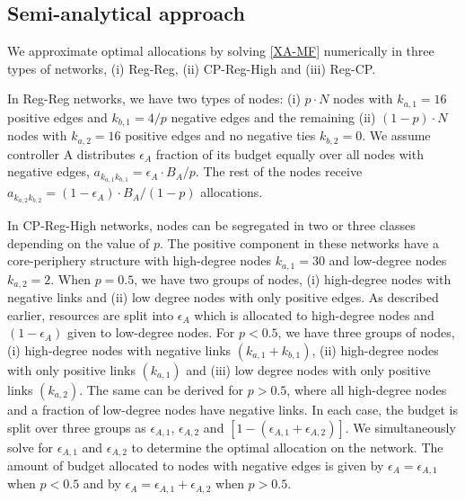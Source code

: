 \subsection{Semi-analytical approach}
\label{semi-analytical}
We approximate optimal allocations by solving \cref{XA-MF} numerically in three types of networks, (i) Reg-Reg, (ii) CP-Reg-High and (iii) Reg-CP. 

In Reg-Reg networks, we have two types of nodes:   
(i) $p \cdot N$ nodes with $k_{a,1}=16$ positive edges and $k_{b,1}=4/p$ negative edges and the remaining (ii) $(1-p) \cdot N$ nodes with $k_{a,2}=16$ positive edges and no negative ties $k_{b,2}=0$. 
We assume controller A distributes $\epsilon_{A}$ fraction of its budget equally over all nodes with negative edges, $a_{k_{a,1}k_{b,1}} = \epsilon_{A} \cdot B_{A}/p$. The rest of the nodes receive $a_{k_{a,2}k_{b,2}} = (1-\epsilon_{A}) \cdot B_{A}/(1-p)$ allocations.


In CP-Reg-High networks, nodes can be segregated in two or three classes depending on the value of $p$. The positive component in these networks have a core-periphery structure with high-degree nodes $k_{a,1}=30$ and low-degree nodes $k_{a,2}=2$.
When $p=0.5$, we have two groups of nodes, (i) high-degree nodes with negative links and (ii) low degree nodes with only positive edges. As described earlier, resources are split into $\epsilon_{A}$ which is allocated to high-degree nodes and $(1-\epsilon_{A})$ given to low-degree nodes. For $p<0.5$, we have three groups of nodes, (i) high-degree nodes with negative links $(k_{a,1}+k_{b,1})$, (ii) high-degree nodes with only positive links $(k_{a,1})$ and (iii) low degree nodes with only positive links $(k_{a,2})$. The same can be derived for $p>0.5$, where all high-degree nodes and a fraction of low-degree nodes have negative links. In each case, the budget is split over three groups as $\epsilon_{A,1}$, $\epsilon_{A,2}$ and $[1 - ( \epsilon_{A,1}+\epsilon_{A,2})]$. We simultaneously solve for $\epsilon_{A,1}$ and $\epsilon_{A,2}$ to determine the optimal allocation on the network. The amount of budget allocated to nodes with negative edges is given by $\epsilon_{A} = \epsilon_{A,1}$ when $p<0.5$ and by $\epsilon_{A} = \epsilon_{A,1}+\epsilon_{A,2}$ when $p>0.5$. 




